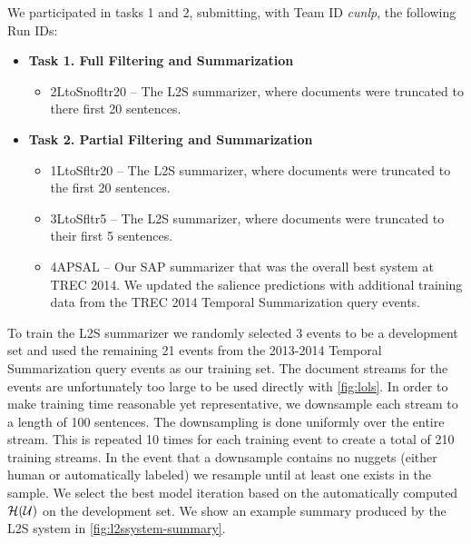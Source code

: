 We participated in tasks 1 and 2, submitting, with Team ID \textit{cunlp},
the following Run IDs:

\begin{itemize}
\item \textbf{Task 1. Full Filtering and Summarization}
\begin{itemize}
    \item  2LtoSnofltr20 -- The L2S summarizer, where documents were
truncated to there first 20 sentences.
\end{itemize}
\item \textbf{Task 2. Partial Filtering and Summarization}
\begin{itemize}
\item  1LtoSfltr20 -- The L2S summarizer, where documents were
truncated to the first 20 sentences.
\item  3LtoSfltr5 -- The L2S summarizer, where documents were truncated to 
their first 5 sentences.
\item  4APSAL -- Our SAP summarizer that was the overall best system 
    at TREC 2014. We updated the salience predictions with additional training
data from the TREC 2014 Temporal Summarization query events.
\end{itemize}
\end{itemize}

To train the L2S summarizer we randomly selected 3 events to be a development
set and used the remaining 21 events from the 2013-2014 Temporal Summarization
query events as our training set. The document streams for the events are
unfortunately too large to be used directly with \autoref{fig:lols}.  In order
to make training time reasonable yet representative, we downsample each stream
to a length of 100 sentences. The downsampling is done uniformly over the
entire stream. This is repeated 10 times for each training event to create a
total of 210 training streams. In the event that a downsample contains no
nuggets (either human or automatically labeled) we resample until at least one
exists in the sample.  We select the best model iteration based on the
automatically computed $\mathcal{H}(\mathcal{U})$ on the development set.
We show an example summary produced by the L2S system in
\autoref{fig:l2ssystem-summary}.





